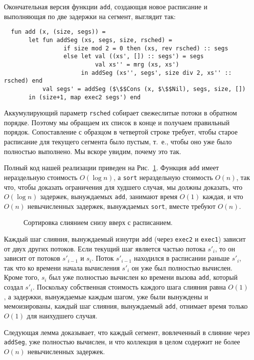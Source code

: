 Окончательная версия функции \lstinline!add!, создающая новое
расписание и выполняющая по две задержки на сегмент, выглядит так:
\begin{lstlisting}
  fun add (x, (size, segs)) =
       let fun addSeg (xs, segs, size, rsched) =
                 if size mod 2 = 0 then (xs, rev rsched) :: segs
                 else let val ((xs', []) :: segs') = segs
                          val xs'' = mrg (xs, xs')
                      in addSeg (xs'', segs', size div 2, xs'' :: rsched) end
           val segs' = addSeg ($\$$Cons (x, $\$$Nil), segs, size, [])
       in (size+1, map exec2 segs') end
\end{lstlisting}
Аккумулирующий параметр \lstinline!rsched! собирает свежеслитые потоки
в обратном порядке. Поэтому мы обращаем их список в конце и
получаем правильный порядок. Сопоставление с образцом в четвертой
строке требует, чтобы старое расписание для текущего сегмента было
пустым, т.~е., чтобы оно уже было полностью выполнено. Мы вскоре
увидим, почему это так.

Полный код нашей реализации приведен на Рис.~\ref{fig:7.3}. Функция
\lstinline!add! имеет нераздельную стоимость $O(\log n)$, а
\lstinline!sort! нераздельную стоимость $O(n)$, так что, чтобы
доказать ограничения для худшего случая, мы должны доказать, что
$O(\log n)$ задержек, вынуждаемых \lstinline!add!, занимают время
$O(1)$ каждая, и что $O(n)$ невычисленных задержек, вынуждаемых
\lstinline!sort!, вместе требуют $O(n)$.

\begin{figure}
  \centering

  \caption{Сортировка слиянием снизу вверх с расписанием.}
  \label{fig:7.3}
\end{figure}

Каждый шаг слияния, вынуждаемый изнутри \lstinline!add! (через
\lstinline!exec2! и \lstinline!exec1!) зависит от двух других
потоков. Если текущий шаг является частью потока $s'_i$, то он зависит
от потоков $s'_{i-1}$ и $s_i$. Поток $s'_{i-1}$ находился в расписании
раньше $s'_i$, так что ко времени начала вычисления $s'_i$ он уже был
полностью вычислен. Кроме того, $s_i$ был уже полностью вычислен ко
времени вызова \lstinline!add!, который создал $s'_i$. Поскольку
собственная стоимость каждого шага слияния равна $O(1)$, а задержки,
вынуждаемые каждым шагом, уже были вынуждены и мемоизированы, каждый
шаг слияния, вынуждаемый \lstinline!add!, отнимает время только $O(1)$
для наихудшего случая.

Следующая лемма доказывает, что каждый сегмент, вовлеченный в слияние
через \lstinline!addSeg!, уже полностью вычислен, и что коллекция в
целом содержит не более $O(n)$ невычисленных задержек.


